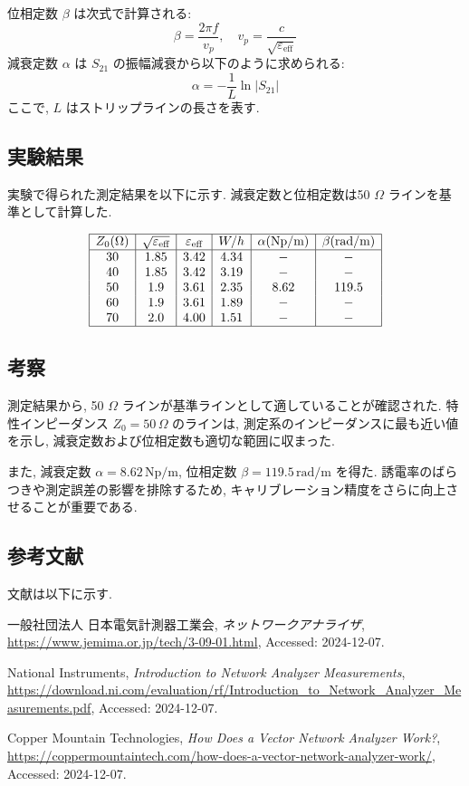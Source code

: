 \documentclass[a4paper, twocolumn]{article} %
\begin{document}
位相定数 \(\beta\) は次式で計算される:
\[
\beta = \frac{2\pi f}{v_p}, \quad v_p = \frac{c}{\sqrt{\varepsilon_{\text{eff}}}}
\]
減衰定数 \(\alpha\) は \(S_{21}\) の振幅減衰から以下のように求められる:
\[
\alpha = -\frac{1}{L} \ln |S_{21}|
\]
ここで, \(L\) はストリップラインの長さを表す.

\subsection{実験結果}
実験で得られた測定結果を以下に示す. 減衰定数と位相定数は50 \(\Omega\) ラインを基準として計算した.

\[
\begin{array}{|c|c|c|c|c|c|}
\hline
Z_0 (\Omega) & \sqrt{\varepsilon_{\text{eff}}} & \varepsilon_{\text{eff}} & W/h & \alpha (\text{Np/m}) & \beta (\text{rad/m}) \\
\hline
30 & 1.85 & 3.42 & 4.34 & - & - \\
40 & 1.85 & 3.42 & 3.19 & - & - \\
50 & 1.9 & 3.61 & 2.35 & 8.62 & 119.5 \\
60 & 1.9 & 3.61 & 1.89 & - & - \\
70 & 2.0 & 4.00 & 1.51 & - & - \\
\hline
\end{array}
\]

\subsection{考察}
測定結果から, 50 \(\Omega\) ラインが基準ラインとして適していることが確認された. 特性インピーダンス \(Z_0 = 50 \, \Omega\) のラインは, 測定系のインピーダンスに最も近い値を示し, 減衰定数および位相定数も適切な範囲に収まった. 

また, 減衰定数 \(\alpha = 8.62 \, \text{Np/m}\), 位相定数 \(\beta = 119.5 \, \text{rad/m}\) を得た. 誘電率のばらつきや測定誤差の影響を排除するため, キャリブレーション精度をさらに向上させることが重要である.

\subsection{参考文献}
文献は以下に示す.

\begin{thebibliography}{9}
    一般社団法人 日本電気計測器工業会,
    \textit{ネットワークアナライザ},
    \url{https://www.jemima.or.jp/tech/3-09-01.html},
    Accessed: 2024-12-07.

    National Instruments,
    \textit{Introduction to Network Analyzer Measurements},
    \url{https://download.ni.com/evaluation/rf/Introduction_to_Network_Analyzer_Measurements.pdf},
    Accessed: 2024-12-07.

    Copper Mountain Technologies,
    \textit{How Does a Vector Network Analyzer Work?},
    \url{https://coppermountaintech.com/how-does-a-vector-network-analyzer-work/},
    Accessed: 2024-12-07.
\end{thebibliography}
\end{document}
